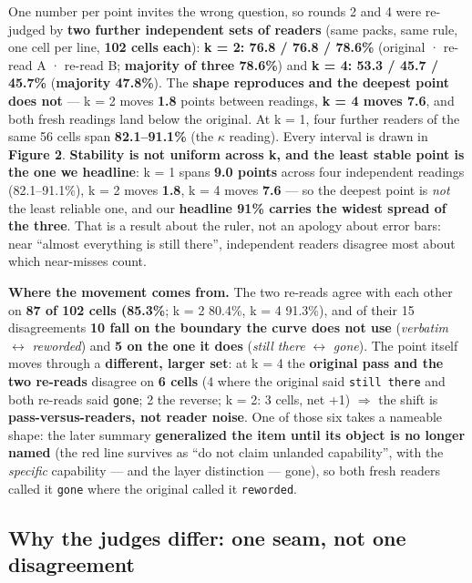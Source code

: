\documentclass[
]{article}
\begin{document}
One number per point invites the wrong question, so rounds 2 and 4 were
re-judged by \textbf{two further independent sets of readers} (same
packs, same rule, one cell per line, \textbf{102 cells each}): \textbf{k
= 2: 76.8 / 76.8 / 78.6\%} (original · re-read A · re-read B;
\textbf{majority of three 78.6\%}) and \textbf{k = 4: 53.3 / 45.7 /
45.7\%} (\textbf{majority 47.8\%}). The \textbf{shape reproduces and the
deepest point does not} --- k = 2 moves \textbf{1.8} points between
readings, \textbf{k = 4 moves 7.6}, and both fresh readings land below
the original. At k = 1, four further readers of the same 56 cells span
\textbf{82.1--91.1\%} (the \ensuremath{\kappa} reading). Every interval
is drawn in \textbf{Figure 2}. \textbf{Stability is not uniform across
k, and the least stable point is the one we headline}: k = 1 spans
\textbf{9.0 points} across four independent readings (82.1--91.1\%), k =
2 moves \textbf{1.8}, k = 4 moves \textbf{7.6} --- so the deepest point
is \emph{not} the least reliable one, and our \textbf{headline 91\%
carries the widest spread of the three}. That is a result about the
ruler, not an apology about error bars: near ``almost everything is
still there'', independent readers disagree most about which near-misses
count.

\textbf{Where the movement comes from.} The two re-reads agree with each
other on \textbf{87 of 102 cells (85.3\%}; k = 2 80.4\%, k = 4 91.3\%),
and of their 15 disagreements \textbf{10 fall on the boundary the curve
does not use} (\emph{verbatim} \ensuremath{\leftrightarrow}
\emph{reworded}) and \textbf{5 on the one it does} (\emph{still there}
\ensuremath{\leftrightarrow} \emph{gone}). The point itself moves
through a \textbf{different, larger set}: at k = 4 the \textbf{original
pass and the two re-reads} disagree on \textbf{6 cells} (4 where the
original said \texttt{still\ there} and both re-reads said
\texttt{gone}; 2 the reverse; k = 2: 3 cells, net +1)
\ensuremath{\Rightarrow} the shift is \textbf{pass-versus-readers, not
reader noise}. One of those six takes a nameable shape: the later
summary \textbf{generalized the item until its object is no longer
named} (the red line survives as ``do not claim unlanded capability'',
with the \emph{specific} capability --- and the layer distinction ---
gone), so both fresh readers called it \texttt{gone} where the original
called it \texttt{reworded}.

\subsection{Why the judges differ: one seam, not one
disagreement}\label{why-the-judges-differ-one-seam-not-one-disagreement}
\end{document}
